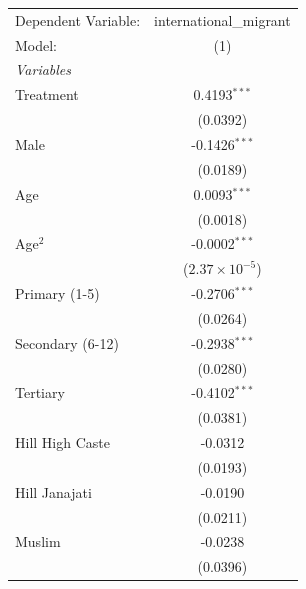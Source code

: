 
\begingroup
\centering
\begin{tabular}{lc}
   \tabularnewline \midrule \midrule
   Dependent Variable:                              & international\_migrant\\   
   Model:                                           & (1)\\  
   \midrule
   \emph{Variables}\\
   Treatment                                        & 0.4193$^{***}$\\   
                                                    & (0.0392)\\   
   Male                                             & -0.1426$^{***}$\\   
                                                    & (0.0189)\\   
   Age                                              & 0.0093$^{***}$\\   
                                                    & (0.0018)\\   
   Age$^2$                                          & -0.0002$^{***}$\\   
                                                    & ($2.37\times 10^{-5}$)\\    
   Primary (1-5)                                    & -0.2706$^{***}$\\   
                                                    & (0.0264)\\   
   Secondary (6-12)                                 & -0.2938$^{***}$\\   
                                                    & (0.0280)\\   
   Tertiary                                         & -0.4102$^{***}$\\   
                                                    & (0.0381)\\   
   Hill High Caste                                  & -0.0312\\   
                                                    & (0.0193)\\   
   Hill Janajati                                    & -0.0190\\   
                                                    & (0.0211)\\   
   Muslim                                           & -0.0238\\   
                                                    & (0.0396)\\   

\end{tabular}
